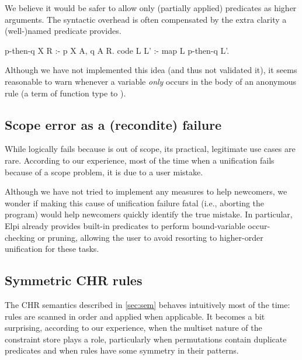 \documentclass[a4paper, 11pt]{book}
\begin{document}
We believe it would
be safer to allow only (partially applied) predicates as
higher arguments. The syntactic overhead is often compensated by the extra
clarity a (well-)named predicate provides.

\begin{elpicode}
p-then-q X R :- p X A, q A R.
code L L' :- map L p-then-q L'.
\end{elpicode}
Although we have not implemented this idea (and thus not validated it), it
seems reasonable to warn whenever a variable \emph{only} occurs in the body of
an anonymous rule (a term of function type to ).

\subsection{Scope error as a (recondite) failure}

While  logically fails because  is out of scope, its
practical, legitimate use cases are rare. According to our experience, most
of the time when a unification fails because of a scope problem, it is due to
a user mistake.

Although we have not tried to implement any measures to help newcomers, we
wonder if making this cause of unification failure fatal (i.e., aborting the
program) would help newcomers quickly identify the true mistake. In
particular, Elpi already provides built-in predicates to perform
bound-variable occur-checking or pruning, allowing the user to avoid resorting
to higher-order unification for these tasks.

\subsection{Symmetric CHR rules}

The CHR semantics described in \cref{sec:sem} behaves intuitively most of the
time: rules are scanned in order and applied when applicable. It becomes a bit
surprising, according to our experience, when the multiset nature of the
constraint store plays a role, particularly when permutations contain
duplicate predicates and when rules have some symmetry in their patterns.
\end{document}

